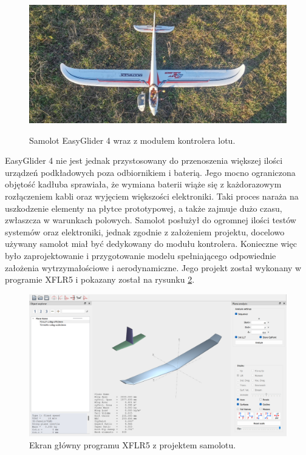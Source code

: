 \documentclass[12pt, a4paper]{article}
\begin{document}
\begin{figure}[ht]
    \centering
    \includegraphics[width=1\textwidth]{budowa1}\\
    \caption{Samolot EasyGlider 4 wraz z modułem kontrolera lotu.}
    \label{fig:eg4}
\end{figure}

EasyGlider 4 nie jest jednak przystosowany do przenoszenia większej ilości urządzeń podkładowych poza odbiornikiem i baterią. Jego mocno ograniczona objętość kadłuba sprawiała, że wymiana baterii wiąże się z każdorazowym rozłączeniem kabli oraz wyjęciem większości elektroniki. Taki proces naraża na uszkodzenie elementy na płytce prototypowej, a także zajmuje dużo czasu, zwłaszcza w warunkach polowych. Samolot posłużył do ogromnej ilości testów systemów oraz elektroniki, jednak zgodnie z założeniem projektu, docelowo używany samolot miał być dedykowany do modułu kontrolera. Konieczne więc było zaprojektowanie i przygotowanie modelu spełniającego odpowiednie założenia wytrzymałościowe i aerodynamiczne. Jego projekt został wykonany w programie XFLR5 i pokazany został na rysunku \ref{fig:xflr}.

 \begin{figure}[ht]
    \centering
    \includegraphics[width=1\textwidth]{xflr}
    \caption{Ekran główny programu XFLR5 z projektem samolotu.}
    \label{fig:xflr}
\end{figure}
\end{document}
